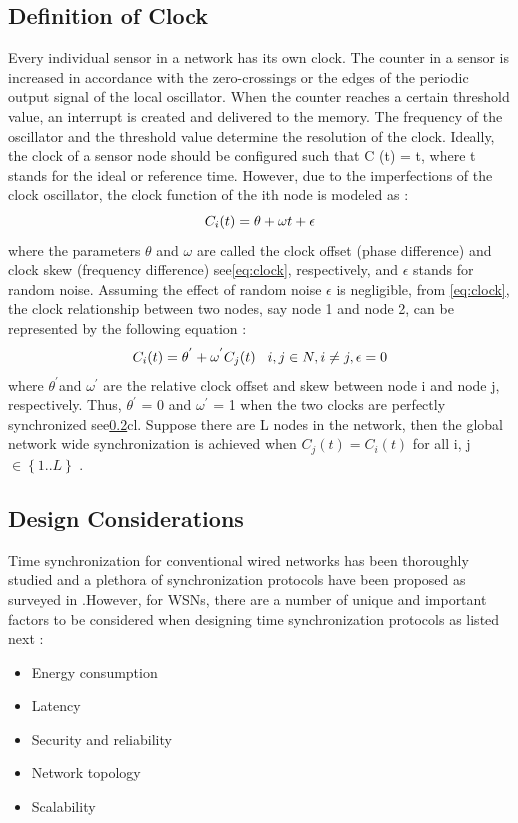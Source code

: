     \subsection{Definition of Clock}
    Every individual sensor in a network has its own clock. The counter in a sensor is increased in accordance with the zero-crossings or the edges of the periodic output signal of the local oscillator. When the counter reaches a certain threshold value, an interrupt is created and delivered to the memory. The frequency of the oscillator and the threshold value determine the resolution of the clock. Ideally, the clock of a sensor node should be configured such that C (t) = t, where t stands for the ideal or reference time. However, due to the imperfections of the clock oscillator, the clock function of the ith node is modeled as :
    \newline
    \begin{equation}
        \centering
        \label{eq:clock}
        C_{i}( t ) = \theta + \omega t + \epsilon
    \end{equation}
    \newline
    where the parameters $\theta$ and $\omega$ are called the clock offset (phase difference) and clock skew (frequency difference) see\ref{eq:clock}, respectively, and  $\epsilon$ stands for random noise.\newline
    Assuming the effect of random noise $\epsilon$ is negligible, from \ref{eq:clock}, the clock relationship between two nodes, say node 1 and node 2, can be represented by the following equation :\newline
     \begin{equation}
        \centering
        \label{eq:two_clock}
        C_{i}( t ) = \theta^{'} + \omega^{'} C_{j}(t) \tab[0.3cm] i,j \in N , i \neq j , \epsilon = 0 
    \end{equation}
    \newline
    where $\theta^{'}$and $\omega^{'}$ are the relative clock offset and skew between node i and node j, respectively. Thus, $\theta^{'}$ = 0 and $\omega^{'}$ = 1 when the two clocks are perfectly synchronized see\ref{}cl. Suppose there are L nodes in the network, then the global network wide synchronization is achieved when $C_{j}(t) = C_{i}(t)$ for all i, j $\in \left\{1..L\right\}$ .
    \subsection{Design Considerations}
    Time synchronization for conventional wired networks has been thoroughly studied and a plethora of synchronization protocols have been proposed as surveyed in \cite{sync5}.However, for WSNs, there are a number of unique and important factors to be considered when designing time synchronization protocols as listed next \cite{book} :
    \begin{itemize}
        \item Energy consumption
        \item Latency
        \item Security and reliability
        \item Network topology
        \item Scalability
    \end{itemize}
